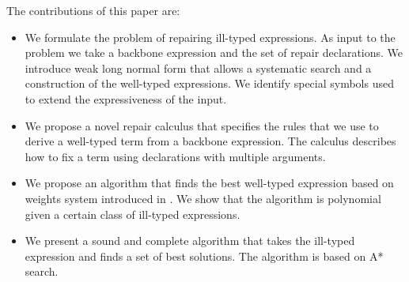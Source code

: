 The contributions of this paper are:
\begin{itemize}
	\item We formulate the problem of repairing ill-typed expressions.
	As input to the problem we take a backbone expression and 
	the set of repair declarations. We introduce weak long normal 
	form that allows a systematic search and a construction of the well-typed expressions.
	We identify special symbols used to extend the expressiveness of the input.
	\item We propose a novel repair calculus that specifies the rules that
	we use to derive a well-typed term from a backbone expression.
	The calculus describes how to fix a term using declarations with multiple arguments.
	\item We propose an algorithm that finds the best well-typed expression based on 
	weights system introduced in \cite{GveroETAL13CompleteCompletionTypesWeights}.
    We show that the algorithm is polynomial given a certain class of ill-typed expressions.
    \item We present a sound and complete algorithm that takes the ill-typed expression and 
    finds a set of best solutions. The algorithm is based on A* search.
\end{itemize}


